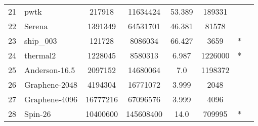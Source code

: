 \begin{tabular}{|l|l|c|c|c|c|c|c|}
{21}	& {pwtk}	& {217918}	& {11634424}	& {53.389}	& {189331}	& {} &	\\
{22}	& {Serena}	& {1391349}	& {64531701}	& {46.381}	& {81578}	& {} &	\\
{23}	& {ship\_003}	& {121728}	& {8086034}	& {66.427}	& {3659}	& {*} &	\\
{24}	& {thermal2}	& {1228045}	& {8580313}	& {6.987}	& {1226000}	& {*} &	\\
\midrule
{25}	& {Anderson-16.5}	& {2097152}	& {14680064}	& {7.0}	& {1198372}	& {} & \multirow{4}{*}{\rotatebox[origin=c]{90}{ESSEX}}	\\
{26}	& {Graphene-2048}	& {4194304}	& {16771072}	& {3.999}	& {2048}	& {} &	\\
{27}	& {Graphene-4096}	& {16777216}	& {67096576}	& {3.999}	& {4096}	& {} &	\\
{28}	& {Spin-26}	& {10400600}	& {145608400}	& {14.0}	& {709995}	& {*} &	\\
\bottomrule
\end{tabular}



